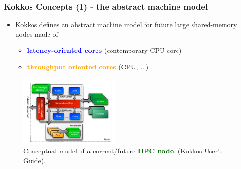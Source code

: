 \begin{frame}
  \frametitle{Kokkos Concepts (1) - the abstract machine model}

  \begin{itemize}
  \item Kokkos defines an abstract machine model for future large shared-memory nodes made of
    \begin{itemize}
    \item \textcolor{blue}{\textbf{latency-oriented cores}} (contemporary CPU core)
    \item \textcolor{orange}{\textbf{throughput-oriented cores}} (GPU, ...)
    \end{itemize}
  \end{itemize}

  \begin{center}
    \begin{figure}
      \includegraphics[width=5cm]{images/kokkos_machine_model}
      \caption{Conceptual model of a current/future \textcolor{darkgreen}{\bf HPC node}. (Kokkos User's Guide).}
    \end{figure}
  \end{center}

\end{frame}


